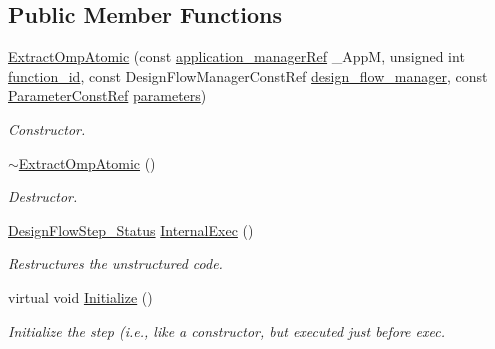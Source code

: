 \subsection*{Public Member Functions}
\begin{DoxyCompactItemize}
\item 
\hyperlink{classExtractOmpAtomic_a449debb45bef665320d88fee731ee540}{Extract\+Omp\+Atomic} (const \hyperlink{application__manager_8hpp_a04ccad4e5ee401e8934306672082c180}{application\+\_\+manager\+Ref} \+\_\+\+AppM, unsigned int \hyperlink{classFunctionFrontendFlowStep_a58ef2383ad1a212a8d3f396625a4b616}{function\+\_\+id}, const Design\+Flow\+Manager\+Const\+Ref \hyperlink{classDesignFlowStep_ab770677ddf087613add30024e16a5554}{design\+\_\+flow\+\_\+manager}, const \hyperlink{Parameter_8hpp_a37841774a6fcb479b597fdf8955eb4ea}{Parameter\+Const\+Ref} \hyperlink{classDesignFlowStep_a802eaafe8013df706370679d1a436949}{parameters})
\begin{DoxyCompactList}\small\item\em Constructor. \end{DoxyCompactList}\item 
\hyperlink{classExtractOmpAtomic_a35bd2a896b53a44e1c9ae0752e7d504e}{$\sim$\+Extract\+Omp\+Atomic} ()
\begin{DoxyCompactList}\small\item\em Destructor. \end{DoxyCompactList}\item 
\hyperlink{design__flow__step_8hpp_afb1f0d73069c26076b8d31dbc8ebecdf}{Design\+Flow\+Step\+\_\+\+Status} \hyperlink{classExtractOmpAtomic_a15be85728c9e9cbfe5db4c754e196782}{Internal\+Exec} ()
\begin{DoxyCompactList}\small\item\em Restructures the unstructured code. \end{DoxyCompactList}\item 
virtual void \hyperlink{classExtractOmpAtomic_a4895f8dc863df77a8e52069c00425977}{Initialize} ()
\begin{DoxyCompactList}\small\item\em Initialize the step (i.\+e., like a constructor, but executed just before exec. \end{DoxyCompactList}\end{DoxyCompactItemize}
